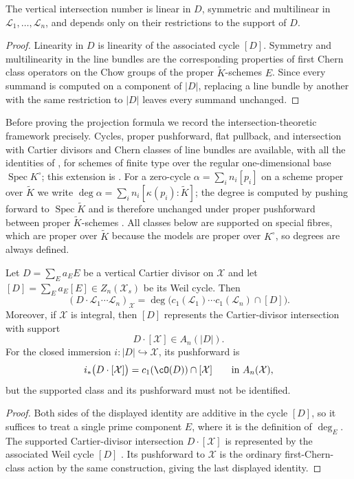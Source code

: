 \begin{proposition}\label{prop:model-intersection-basic}
The vertical intersection number is linear in $D$, symmetric and multilinear
in $\mathcal L_1,\ldots,\mathcal L_n$, and depends only on their restrictions
to the support of $D$.
\end{proposition}
\begin{proof}
Linearity in $D$ is linearity of the associated cycle $[D]$.  Symmetry and
multilinearity in the line bundles are the corresponding properties of first
Chern class operators on the Chow groups of the proper
$\widetilde K$-schemes $E$.  Since every summand is computed on a component
of $|D|$, replacing a line bundle by another with the same restriction to
$|D|$ leaves every summand unchanged.
\end{proof}

Before proving the projection formula we record the intersection-theoretic
framework precisely.  Cycles, proper pushforward, flat pullback, and
intersection with Cartier divisors and Chern classes of line bundles are
available, with all the identities of \cite[Chapters~1--2]{Ful}, for
schemes of finite type over the regular one-dimensional base
$\operatorname{Spec}K^\circ$; this extension is
\cite[\S20.1]{Ful}.  For a zero-cycle $\alpha=\sum_i n_i[p_i]$ on a scheme
proper over $\widetilde K$ we write
$\deg\alpha=\sum_in_i[\kappa(p_i):\widetilde K]$; the degree is computed by
pushing forward to $\operatorname{Spec}\widetilde K$ and is therefore
unchanged under proper pushforward between proper
$\widetilde K$-schemes \cite[\S1.4]{Ful}.  All classes below are supported
on special fibres, which are proper over $\widetilde K$ because the models
are proper over $K^\circ$, so degrees are always defined.

\begin{lemma}
\label{lem:vertical-intersection-degree}
Let $D=\sum_Ea_EE$ be a vertical Cartier divisor on $\mathcal X$ and let
$[D]=\sum_Ea_E[E]\in Z_n(\mathcal X_s)$ be its Weil cycle.  Then
\[
 (D\cdot\mathcal L_1\cdots\mathcal L_n)_{\mathcal X}
 =\deg\bigl(c_1(\mathcal L_1)\cdots c_1(\mathcal L_n)\cap[D]\bigr).
\]
Moreover, if $\mathcal X$ is integral, then $[D]$ represents the
Cartier-divisor intersection with support
\[
                      D\mathbin{\cdot}[\mathcal X]\in A_n(|D|).
\]
For the closed immersion $i:|D|\hookrightarrow\mathcal X$, its pushforward
is
\[
 i_*\bigl(D\mathbin{\cdot}[\mathcal X]\bigr)
       =c_1(\cO(D))\cap[\mathcal X]\qquad\text{in }A_n(\mathcal X),
\]
but the supported class and its pushforward must not be identified.
\end{lemma}
\begin{proof}
Both sides of the displayed identity are additive in the cycle $[D]$, so it
suffices to treat a single prime component $E$, where it is the definition
of $\deg_E$.  The supported Cartier-divisor intersection
$D\mathbin{\cdot}[\mathcal X]$ is represented by the associated Weil cycle
$[D]$ \cite[\S2.3]{Ful}.  Its pushforward to $\mathcal X$ is the ordinary
first-Chern-class action by the same construction, giving the last displayed
identity.
\end{proof}

